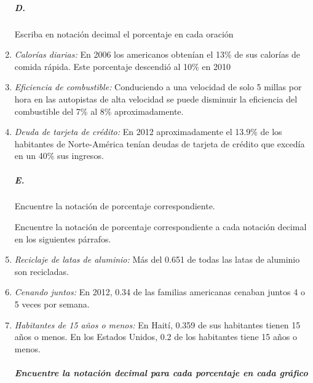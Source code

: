 \documentclass[twoside]{article}
\begin{document}
\begin{enumerate}
\subparagraph*{D.} Escriba en notación decimal el porcentaje en cada oración
\item \textit{Calorías diarias:} En 2006 los americanos obtenían el 13\% de sus calorías de comida rápida. Este porcentaje descendió al 10\% en 2010
\item \textit{Eficiencia de combustible:} Conduciendo a una velocidad de solo 5 millas por hora en las autopistas de alta velocidad se puede disminuir la eficiencia del combustible del 7\% al 8\% aproximadamente.
\item \textit{Deuda de tarjeta de crédito:} En 2012 aproximadamente el 13.9\% de los habitantes de Norte-América tenían deudas de tarjeta de crédito que excedía en un 40\% sus ingresos.
\subparagraph*{E.} Encuentre la notación de porcentaje correspondiente.
Encuentre la notación de porcentaje correspondiente a cada notación decimal en los siguientes párrafos.
\item \textit{Reciclaje de latas de aluminio:} Más del 0.651 de todas las latas de aluminio son recicladas.
\item \textit{Cenando juntos:} En 2012, 0.34 de las familias americanas cenaban juntos 4 o 5 veces por semana.
\item \textit{Habitantes de 15 años o menos:} En Haití, 0.359 de sus habitantes tienen 15 años o menos. En los Estados Unidos, 0.2 de los habitantes tiene 15 años o menos.
\subparagraph*{Encuentre la notación decimal para cada porcentaje en cada gráfico }
\begin{multicols}{2}

\end{multicols}
\end{enumerate}
\end{document}
